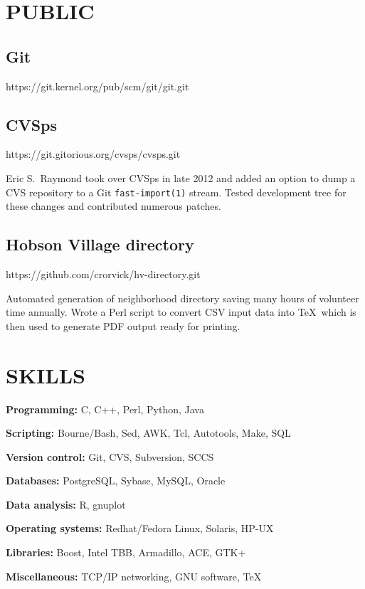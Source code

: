 \section{PUBLIC}{%
\parskip=3pt
\subsection{Git}        {\tb https://git.kernel.org/pub/scm/git/git.git}




\vskip 8pt

\subsection{CVSps}       {\tb https://git.gitorious.org/cvsps/cvsps.git}

Eric S.\ Raymond took over CVSps in late 2012 and added an option to
dump a CVS repository to a Git {\tt fast-import(1)} stream.  Tested
development tree for these changes and contributed numerous patches.

\vskip 8pt

\subsection{Hobson Village directory}
                      {\tb https://github.com/crorvick/hv-directory.git}

Automated generation of neighborhood directory saving many hours of
volunteer time annually.  Wrote a Perl script to convert CSV input data
into \TeX\ which is then used to generate PDF output ready for printing.
}

\section{SKILLS}{%
{\bf Programming:} C, C++, Perl, Python, Java

{\bf Scripting:} Bourne/Bash, Sed, AWK, Tcl, Autotools, Make, SQL

{\bf Version control:} Git, CVS, Subversion, SCCS

{\bf Databases:} PostgreSQL, Sybase, MySQL, Oracle

{\bf Data analysis:} R, gnuplot

{\bf Operating systems:} Redhat/Fedora Linux, Solaris, HP-UX

{\bf Libraries:} Boost, Intel TBB, Armadillo, ACE, GTK+

{\bf Miscellaneous:} TCP/IP networking, GNU software, \TeX
}

